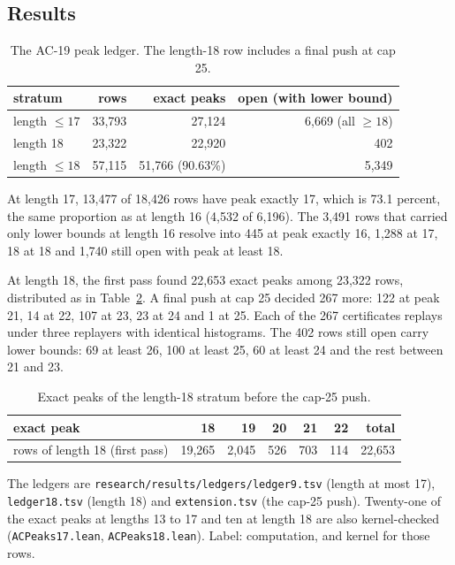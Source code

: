 \documentclass[11pt,a4paper]{article}
\theoremstyle{definition}
\begin{document}
\subsection{Results}

\begin{table}[h]
\centering
\begin{tabular}{lrrr}
\toprule
stratum & rows & exact peaks & open (with lower bound) \\
\midrule
length $\le 17$ & 33,793 & 27,124 & 6,669 (all $\ge 18$) \\
length 18 & 23,322 & 22,920 & 402 \\
\midrule
length $\le 18$ & 57,115 & 51,766 (90.63\%) & 5,349 \\
\bottomrule
\end{tabular}
\caption{The AC-19 peak ledger. The length-18 row includes a final push at cap 25.}
\label{tab:ac19}
\end{table}

At length 17, 13,477 of 18,426 rows have peak exactly 17, which is 73.1 percent, the same proportion as at length 16 (4,532 of 6,196). The 3,491 rows that carried only lower bounds at length 16 resolve into 445 at peak exactly 16, 1,288 at 17, 18 at 18 and 1,740 still open with peak at least 18.

At length 18, the first pass found 22,653 exact peaks among 23,322 rows, distributed as in Table~\ref{tab:ac19hist}. A final push at cap 25 decided 267 more: 122 at peak 21, 14 at 22, 107 at 23, 23 at 24 and 1 at 25. Each of the 267 certificates replays under three replayers with identical histograms. The 402 rows still open carry lower bounds: 69 at least 26, 100 at least 25, 60 at least 24 and the rest between 21 and 23.

\begin{table}[h]
\centering
\begin{tabular}{lrrrrrr}
\toprule
exact peak & 18 & 19 & 20 & 21 & 22 & total \\
\midrule
rows of length 18 (first pass) & 19,265 & 2,045 & 526 & 703 & 114 & 22,653 \\
\bottomrule
\end{tabular}
\caption{Exact peaks of the length-18 stratum before the cap-25 push.}
\label{tab:ac19hist}
\end{table}

The ledgers are \texttt{research/results/ledgers/ledger9.tsv} (length at most 17), \texttt{ledger18.tsv} (length 18) and \texttt{extension.tsv} (the cap-25 push). Twenty-one of the exact peaks at lengths 13 to 17 and ten at length 18 are also kernel-checked (\texttt{ACPeaks17.lean}, \texttt{ACPeaks18.lean}). Label: computation, and kernel for those rows.
\end{document}
